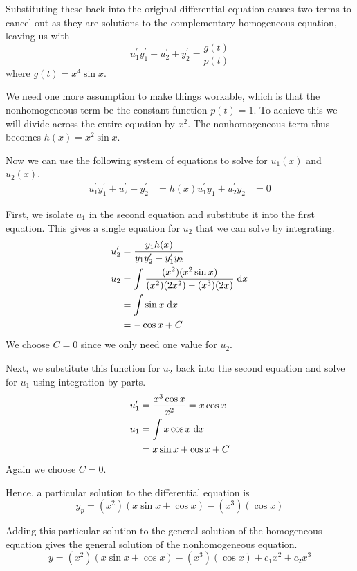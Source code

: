 \documentclass[letterpaper,11pt]{article}
\newcommand{\intd}[1]{{\ensuremath \; \mathrm{d}#1}}
\begin{document}
\begin{enumerate}
        Substituting these back into the original differential equation causes
        two terms to cancel out as they are solutions to the complementary
        homogeneous equation, leaving us with
        \begin{equation*}
            u_1^\prime y_1^\prime + u_2^\prime + y_2^\prime = \frac{g(t)}{p(t)}
        \end{equation*}
        where $g(t) = x^4 \sin x$.

        We need one more assumption to make things workable, which is that the
        nonhomogeneous term be the constant function $p(t) = 1$. To achieve
        this we will divide across the entire equation by $x^2$. The
        nonhomogeneous term thus becomes $h(x) = x^2 \sin x$.

        Now we can use the following system of equations to solve for $u_1(x)$
        and $u_2(x)$.
        \begin{align*}
            u_1^\prime y_1^\prime + u_2^\prime + y_2^\prime &= h(x)
            u_1^\prime y_1 + u_2^\prime y_2 &= 0
        \end{align*}

        First, we isolate $u_1$ in the second equation and substitute it into
        the first equation. This gives a single equation for $u_2$ that we can
        solve by integrating.
        \begin{align*}
            u_2^\prime &= \frac{y_1 h(x)}{y_1 y_2^\prime - y_1^\prime y_2} \\
            u_2 &=
                \int{\frac{(x^2)(x^2 \sin x)}{(x^2)(2x^2) - (x^3)(2x)}}\intd{x} \\
                &= \int{\sin x}\intd{x} \\
                &= -\cos x + C
        \end{align*}
        We choose $C = 0$ since we only need one value for $u_2$.

        Next, we substitute this function for $u_2$ back into the second
        equation and solve for $u_1$ using integration by parts.
        \begin{align*}
            u_1^\prime &= \frac{x^3 \cos x}{x^2} = x \cos x \\
            u_1 &= \int{x \cos x}\intd{x} \\
                &= x \sin x + \cos x + C
        \end{align*}
        Again we choose $C = 0$.

        Hence, a particular solution to the differential equation is
        \begin{equation*}
            y_p = (x^2)(x \sin x + \cos x) - (x^3)(\cos x)
        \end{equation*}

        Adding this particular solution to the general solution of the
        homogeneous equation gives the general solution of the nonhomogeneous
        equation.
        \begin{equation*}
            y = (x^2)(x \sin x + \cos x) - (x^3)(\cos x)
                + c_1 x^2 + c_2 x^3
        \end{equation*}
\end{enumerate}
\end{document}
